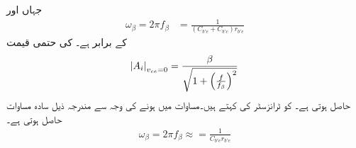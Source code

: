 جہاں  اور
\begin{align} \label{مساوات_تعددی_ردعمل_بلند_انقطاعی_بیٹا_تعدد}
\omega_{\beta}=2 \pi f_{\beta}&=\frac{1}{\left(C_{b'e}+C_{b'c} \right) r_{b'e}}
\end{align}
کے برابر ہے۔ کی حتمی قیمت
\begin{align} \label{مساوات_تعددی_ردعمل_کسر_دور_حتمی_افزائش}
\abs{A_i}_{v_{ce}=0}=\frac{\beta}{\sqrt{1+\left(\frac{f}{f_{\beta}} \right)^2}}
\end{align}
حاصل ہوتی ہے۔ کو ٹرانزسٹر کی   کہتے ہیں۔مساوات  میں  ہونے کی وجہ سے مندرجہ ذیل سادہ مساوات حاصل ہوتی ہے۔
\begin{align} \label{مساوات_تعددی_ردعمل_کسر_دور_انقطاعی_تعدد}
\omega_{\beta}=2 \pi f_{\beta} \approx =\frac{1}{C_{b'e} r_{b'e}}
\end{align}


